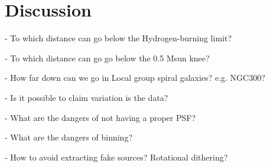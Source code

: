 \section{Discussion}
\label{sec:discussion}




- To which distance can go below the Hydrogen-burning limit?

- To which distance can go go below the 0.5 Msun knee?

- How far down can we go in Local group spiral galaxies? e.g. NGC300?

- Is it possible to claim variation is the data?


- What are the dangers of not having a proper PSF?

- What are the dangers of binning?

- How to avoid extracting fake sources? Rotational dithering?